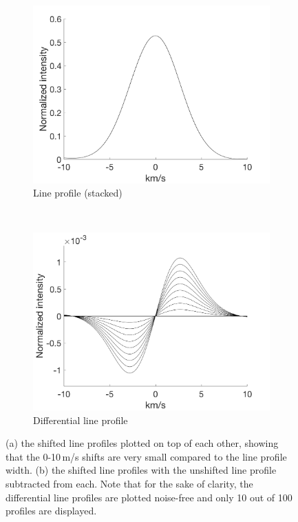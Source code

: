 \begin{figure}[tbp]
    \begin{subfigure}[b]{0.49\textwidth}
        \includegraphics[width=\textwidth]{./Figures/Methods/1-Line_Profile.png}
        \caption{Line profile (stacked)}
        \label{fig:line_profiles}
    \end{subfigure}
	~
    \begin{subfigure}[b]{0.49\textwidth}
        \includegraphics[width=\textwidth]{./Figures/Methods/1-Differential_line_Profile.png}
        \caption{Differential line profile}
        \label{fig:differential_line_profiles}
    \end{subfigure}	
    
    \caption[100 shifted HARPS-like line profiles]{(a) the shifted line profiles plotted on top of each other, showing that the 0-10\,m/s shifts are very small compared to the line profile width. (b) the shifted line profiles with the unshifted line profile subtracted from each. Note that for the sake of clarity, the differential line profiles are plotted noise-free and only 10 out of 100 profiles are displayed.}
\label{fig:line_profiles12}
\end{figure}	

